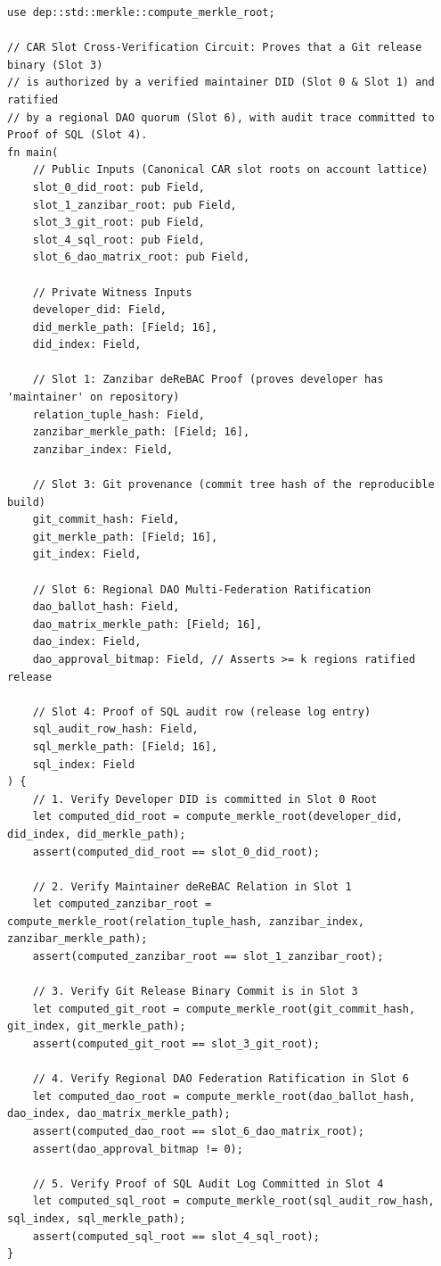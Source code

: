 \documentclass[a4paper,11pt,twoside,parskip=half-,headings=small]{scrartcl}
\newcommand{\code}[1]{\texttt{#1}}
\begin{document}
\begin{lstlisting}[language=Noir,basicstyle=\ttfamily\fontsize{6.5pt}{7.8pt}\selectfont,label=lst:cross_slot_noir,caption={Noir Circuit: Cross-Slot Verification of Git Build Provenance, Zanzibar deReBAC, and Proof of SQL (\code{circuits/src/cross\_slot\_verifier.nr})}]
use dep::std::merkle::compute_merkle_root;

// CAR Slot Cross-Verification Circuit: Proves that a Git release binary (Slot 3)
// is authorized by a verified maintainer DID (Slot 0 & Slot 1) and ratified
// by a regional DAO quorum (Slot 6), with audit trace committed to Proof of SQL (Slot 4).
fn main(
    // Public Inputs (Canonical CAR slot roots on account lattice)
    slot_0_did_root: pub Field,
    slot_1_zanzibar_root: pub Field,
    slot_3_git_root: pub Field,
    slot_4_sql_root: pub Field,
    slot_6_dao_matrix_root: pub Field,

    // Private Witness Inputs
    developer_did: Field,
    did_merkle_path: [Field; 16],
    did_index: Field,

    // Slot 1: Zanzibar deReBAC Proof (proves developer has 'maintainer' on repository)
    relation_tuple_hash: Field,
    zanzibar_merkle_path: [Field; 16],
    zanzibar_index: Field,

    // Slot 3: Git provenance (commit tree hash of the reproducible build)
    git_commit_hash: Field,
    git_merkle_path: [Field; 16],
    git_index: Field,

    // Slot 6: Regional DAO Multi-Federation Ratification
    dao_ballot_hash: Field,
    dao_matrix_merkle_path: [Field; 16],
    dao_index: Field,
    dao_approval_bitmap: Field, // Asserts >= k regions ratified release

    // Slot 4: Proof of SQL audit row (release log entry)
    sql_audit_row_hash: Field,
    sql_merkle_path: [Field; 16],
    sql_index: Field
) {
    // 1. Verify Developer DID is committed in Slot 0 Root
    let computed_did_root = compute_merkle_root(developer_did, did_index, did_merkle_path);
    assert(computed_did_root == slot_0_did_root);

    // 2. Verify Maintainer deReBAC Relation in Slot 1
    let computed_zanzibar_root = compute_merkle_root(relation_tuple_hash, zanzibar_index, zanzibar_merkle_path);
    assert(computed_zanzibar_root == slot_1_zanzibar_root);

    // 3. Verify Git Release Binary Commit is in Slot 3
    let computed_git_root = compute_merkle_root(git_commit_hash, git_index, git_merkle_path);
    assert(computed_git_root == slot_3_git_root);

    // 4. Verify Regional DAO Federation Ratification in Slot 6
    let computed_dao_root = compute_merkle_root(dao_ballot_hash, dao_index, dao_matrix_merkle_path);
    assert(computed_dao_root == slot_6_dao_matrix_root);
    assert(dao_approval_bitmap != 0);

    // 5. Verify Proof of SQL Audit Log Committed in Slot 4
    let computed_sql_root = compute_merkle_root(sql_audit_row_hash, sql_index, sql_merkle_path);
    assert(computed_sql_root == slot_4_sql_root);
}
\end{lstlisting}
\end{document}
